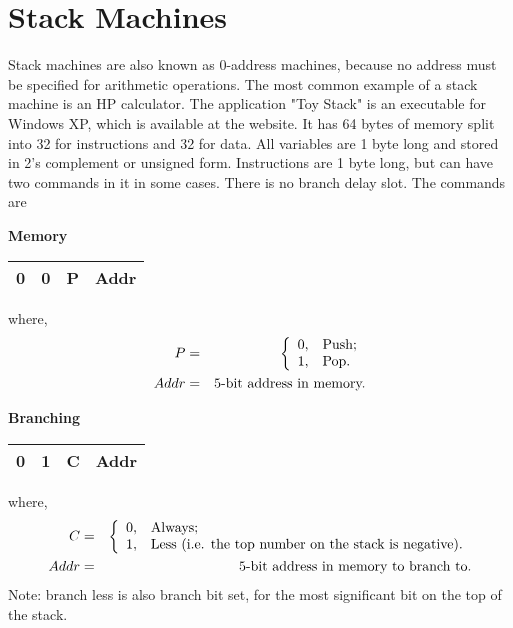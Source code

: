 \chapter{Stack Machines}
\label{c-stack}


Stack machines are also known as 0-address machines, because no address must be specified for arithmetic operations.  The most common example of a stack machine is an HP calculator.  The application "Toy Stack" is an executable for Windows XP, which is available at the website.  It has 64 bytes of memory split into 32 for instructions and 32 for data.  All variables are 1 byte long and stored in 2's complement or unsigned form.  Instructions are 1 byte long, but can have two commands in it in some cases.  There is no branch delay slot.  The commands are

\textbf{Memory}

\begin{tabular}{|cc|c|c|}
\hline
  0 & 0 & P & Addr \\ \hline
\end{tabular}

where,
\begin{eqnarray*}
  P &=& \left\{%
\begin{array}{ll}
    0, & \hbox{Push;} \\
    1, & \hbox{Pop.} \\
\end{array}%
\right.     \\
  Addr &=& \hbox{5-bit address in memory.}
\end{eqnarray*}


\textbf{Branching}

\begin{tabular}{|cc|c|c|}
\hline
  0 & 1 & C & Addr \\ \hline
\end{tabular}

where,
\begin{eqnarray*}
  C &=& \left\{%
\begin{array}{ll}
    0, & \hbox{Always;} \\
    1, & \hbox{Less (i.e. the top number on the stack is negative).} \\
\end{array}%
\right.     \\
  Addr &=& \hbox{5-bit address in memory to branch to.}
\end{eqnarray*}
Note: branch less is also branch bit set, for the most significant bit on the top of the stack.



